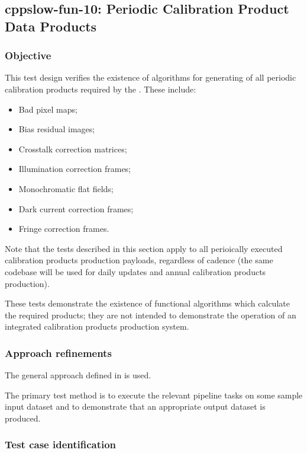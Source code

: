 \subsection{cppslow-fun-10: Periodic Calibration Product Data Products}
\label{cppslow-fun-10}

\subsubsection{Objective}

This test design verifies the existence of algorithms for generating of all
periodic calibration products required by the . These include:

\begin{itemize}

  \item{Bad pixel maps;}
  \item{Bias residual images;}
  \item{Crosstalk correction matrices;}
  \item{Illumination correction frames;}
  \item{Monochromatic flat fields;}
  \item{Dark current correction frames;}
  \item{Fringe correction frames.}

\end{itemize}

Note that the tests described in this section apply to all perioically
executed calibration products production payloads, regardless of cadence (the
same codebase will be used for daily updates and annual calibration products
production).

These tests demonstrate the existence of functional algorithms which calculate
the required products; they are not intended to demonstrate the operation of
an integrated calibration products production system.

\subsubsection{Approach refinements}

The general approach defined in  is used.

The primary test method is to execute the relevant pipeline tasks on some
sample input dataset and to demonstrate that an appropriate output dataset is
produced.

\subsubsection{Test case identification}

